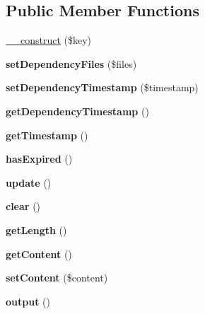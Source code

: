 \subsection*{Public Member Functions}
\begin{DoxyCompactItemize}
\item 
\hyperlink{classCacheEntry_a827f326a6ca9262dd01769dff2fd302c}{\_\-\_\-construct} (\$key)
\item 
\hypertarget{classCacheEntry_a53e12186592e3b66853cdf20a5d917cc}{
{\bfseries setDependencyFiles} (\$files)}
\label{classCacheEntry_a53e12186592e3b66853cdf20a5d917cc}

\item 
\hypertarget{classCacheEntry_ab9043f64a2e09c87775561bec43037be}{
{\bfseries setDependencyTimestamp} (\$timestamp)}
\label{classCacheEntry_ab9043f64a2e09c87775561bec43037be}

\item 
\hypertarget{classCacheEntry_a2adb13ef5d64b8d905184d04a428c64f}{
{\bfseries getDependencyTimestamp} ()}
\label{classCacheEntry_a2adb13ef5d64b8d905184d04a428c64f}

\item 
\hypertarget{classCacheEntry_a5f1115160f227fb59b00d15a03593a5d}{
{\bfseries getTimestamp} ()}
\label{classCacheEntry_a5f1115160f227fb59b00d15a03593a5d}

\item 
\hypertarget{classCacheEntry_a980e98615603036c55c9db6ea338c34c}{
{\bfseries hasExpired} ()}
\label{classCacheEntry_a980e98615603036c55c9db6ea338c34c}

\item 
\hypertarget{classCacheEntry_a03e483cd10e0b053312ee5209b0443c5}{
{\bfseries update} ()}
\label{classCacheEntry_a03e483cd10e0b053312ee5209b0443c5}

\item 
\hypertarget{classCacheEntry_adfbb7f3424b021299e2dd2c445177ff0}{
{\bfseries clear} ()}
\label{classCacheEntry_adfbb7f3424b021299e2dd2c445177ff0}

\item 
\hypertarget{classCacheEntry_ac5db6b7486ef1a6100d8a9248d07e71a}{
{\bfseries getLength} ()}
\label{classCacheEntry_ac5db6b7486ef1a6100d8a9248d07e71a}

\item 
\hypertarget{classCacheEntry_a2d69e6a12d34bc5dff90861944999461}{
{\bfseries getContent} ()}
\label{classCacheEntry_a2d69e6a12d34bc5dff90861944999461}

\item 
\hypertarget{classCacheEntry_a99e701581c5b6b0b43a30fc4467fe5a6}{
{\bfseries setContent} (\$content)}
\label{classCacheEntry_a99e701581c5b6b0b43a30fc4467fe5a6}

\item 
\hypertarget{classCacheEntry_a1545ccd1ad6fb731f27e6b14b636e115}{
{\bfseries output} ()}
\label{classCacheEntry_a1545ccd1ad6fb731f27e6b14b636e115}

\end{DoxyCompactItemize}
